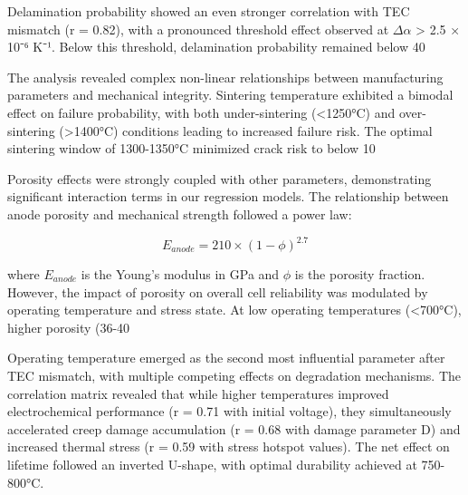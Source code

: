 \documentclass[conference]{IEEEtran}
\begin{document}
Delamination probability showed an even stronger correlation with TEC mismatch (r = 0.82), with a pronounced threshold effect observed at $\Delta\alpha$ > 2.5 × 10⁻⁶ K⁻¹. Below this threshold, delamination probability remained below 40%

The analysis revealed complex non-linear relationships between manufacturing parameters and mechanical integrity. Sintering temperature exhibited a bimodal effect on failure probability, with both under-sintering (<1250°C) and over-sintering (>1400°C) conditions leading to increased failure risk. The optimal sintering window of 1300-1350°C minimized crack risk to below 10%

Porosity effects were strongly coupled with other parameters, demonstrating significant interaction terms in our regression models. The relationship between anode porosity and mechanical strength followed a power law:

\begin{equation}
E_{anode} = 210 \times (1 - \phi)^{2.7}
\end{equation}

where $E_{anode}$ is the Young's modulus in GPa and $\phi$ is the porosity fraction. However, the impact of porosity on overall cell reliability was modulated by operating temperature and stress state. At low operating temperatures (<700°C), higher porosity (36-40%

Operating temperature emerged as the second most influential parameter after TEC mismatch, with multiple competing effects on degradation mechanisms. The correlation matrix revealed that while higher temperatures improved electrochemical performance (r = 0.71 with initial voltage), they simultaneously accelerated creep damage accumulation (r = 0.68 with damage parameter D) and increased thermal stress (r = 0.59 with stress hotspot values). The net effect on lifetime followed an inverted U-shape, with optimal durability achieved at 750-800°C.
\end{document}
